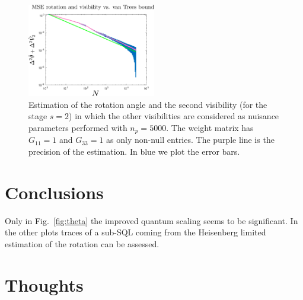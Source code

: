 \documentclass[aps, pra, 10pt, twocolumn, superscriptaddress,floatfix]{revtex4-1}
\begin{document}
% 
\begin{figure}[!t]
	\begin{center}
		\includegraphics[width=0.5\textwidth]{thetaV2-5000.pdf}
	\end{center}
	\caption{Estimation of the rotation angle and the second visibility (for the stage $s=2$) in which the other visibilities are considered as nuisance parameters performed with $n_p = 5000$. The weight matrix has $G_{11} = 1$ and $G_{33} = 1$ as only non-null entries. The purple line is the precision of the estimation. In blue we plot the error bars.}
	\label{fig:thetaV2-5000}
\end{figure}

\section{Conclusions}
%
Only in Fig.~\ref{fig:theta} the improved quantum scaling seems to be significant. In the other plots traces of a sub-SQL coming from the Heisenberg limited estimation of the rotation can be assessed. 

\section{Thoughts}
\end{document}

